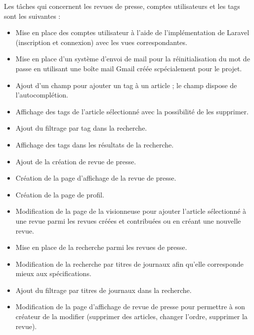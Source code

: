 Les tâches qui concernent les revues de presse, comptes utilisateurs et les tags sont les suivantes :

\begin{itemize}
\setlength\itemsep{1em}

	\item Mise en place des comptes utilisateur à l'aide de l'implémentation de Laravel (inscription et connexion) avec les vues correspondantes.

	\item Mise en place d'un système d'envoi de mail pour la réinitialisation du mot de passe en utilisant une boîte mail Gmail créée scpécialement pour le projet.

	\item Ajout d'un champ pour ajouter un tag à un article ; le champ dispose de l'autocomplétion.

	\item Affichage des tags de l'article sélectionné avec la possibilité de les supprimer.

	\item Ajout du filtrage par tag dans la recherche.

	\item Affichage des tags dans les résultats de la recherche.

	\item Ajout de la création de revue de presse.

	\item Création de la page d'affichage de la revue de presse.

	\item Création de la page de profil.

	\item Modification de la page de la visionneuse pour ajouter l'article sélectionné à une revue parmi les revues créées et contribuées ou en créant une nouvelle revue.

	\item Mise en place de la recherche parmi les revues de presse.

	\item Modification de la recherche par titres de journaux afin qu'elle corresponde mieux aux spécifications.

	\item Ajout du filtrage par titres de journaux dans la recherche.

	\item Modification de la page d'affichage de revue de presse pour permettre à son créateur de la modifier (supprimer des articles, changer l'ordre, supprimer la revue).


\end{itemize}
